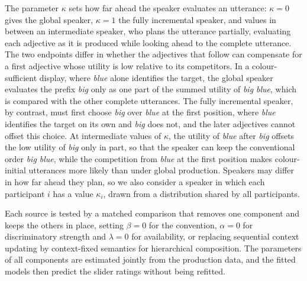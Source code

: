 \documentclass[10pt,a4paper,fleqn]{article}
\begin{document}
The parameter $\kappa$ sets how far ahead the speaker evaluates an utterance: $\kappa=0$ gives the global speaker, $\kappa=1$ the fully incremental speaker, and values in between an intermediate speaker, who plans the utterance partially, evaluating each adjective as it is produced while looking ahead to the complete utterance.
The two endpoints differ in whether the adjectives that follow can compensate for a first adjective whose utility is low relative to its competitors.
In a colour-sufficient display, where \emph{blue} alone identifies the target, the global speaker evaluates the prefix \emph{big} only as one part of the summed utility of \emph{big blue}, which is compared with the other complete utterances.
The fully incremental speaker, by contrast, must first choose \emph{big} over \emph{blue} at the first position, where \emph{blue} identifies the target on its own and \emph{big} does not, and the later adjectives cannot offset this choice.
At intermediate values of $\kappa$, the utility of \emph{blue} after \emph{big} offsets the low utility of \emph{big} only in part, so that the speaker can keep the conventional order \emph{big blue}, while the competition from \emph{blue} at the first position makes colour-initial utterances more likely than under global production.
Speakers may differ in how far ahead they plan, so we also consider a speaker in which each participant $i$ has a value $\kappa_i$, drawn from a distribution shared by all participants.

Each source is tested by a matched comparison that removes one component and keeps the others in place, setting $\beta=0$ for the convention, $\alpha=0$ for discriminatory strength and $\lambda=0$ for availability, or replacing sequential context updating by context-fixed semantics for hierarchical composition.
The parameters of all components are estimated jointly from the production data, and the fitted models then predict the slider ratings without being refitted.
\end{document}

